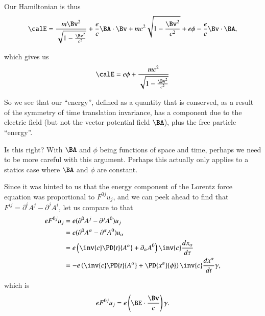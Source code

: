{Our Hamiltonian is thus
%
\begin{equation}\label{eqn:relativisticElectrodynamicsT3:1050}
\begin{aligned}
\calE
=
\frac{m \Bv^2}{\sqrt{1 - \frac{\Bv^2}{c^2}}} + \frac{e}{c} \BA \cdot \Bv
+ m c^2 \sqrt{1 - \frac{\Bv^2}{c^2}} + e \phi - \frac{e}{c} \Bv \cdot \BA,
\end{aligned}
\end{equation}

which gives us
%
\begin{equation}\label{eqn:relativisticElectrodynamicsT3:1070}
\begin{aligned}
\calE = e \phi + \frac{m c^2}{\sqrt{1 - \frac{\Bv^2}{c^2}}}
\end{aligned}
\end{equation}

So we see that our ``energy'', defined as a quantity that is conserved, as a result of the symmetry of time translation invariance, has a component due to the electric field (but not the vector potential field \(\BA\)), plus the free particle ``energy''.

Is this right?  With \(\BA\) and \(\phi\) being functions of space and time, perhaps we need to be more careful with this argument.  Perhaps this actually only applies to a statics case where \(\BA\) and \(\phi\) are constant.

Since it was hinted to us that the energy component of the Lorentz force equation was proportional to \(F^{0j} u_j\), and we can peek ahead to find that \(F^{ij} = \partial^i A^j - \partial^j A^i\), let us compare to that
%
\begin{equation}\label{eqn:relativisticElectrodynamicsT3:1090}
\begin{aligned}
e F^{0 j} u_j
&=
e (\partial^0 A^j - \partial^j A^0) u_j \\
&=
e (\partial^0 A^\alpha - \partial^\alpha A^0) u_\alpha \\
&=
e \left( \inv{c} \PD{t}{A^\alpha} + \partial_\alpha A^0 \right) \inv{c} \frac{dx_\alpha}{d\tau} \\
&=
-e \left( \inv{c} \PD{t}{A^\alpha} + \PD{x^\alpha}{\phi} \right) \inv{c} \frac{dx^\alpha}{dt} \gamma,
\end{aligned}
\end{equation}

which is
%
\begin{equation}\label{eqn:relativisticElectrodynamicsT3:910}
e F^{0 j} u_j = e \left(\BE \cdot \frac{\Bv}{c}\right) \gamma.
\end{equation}

}
